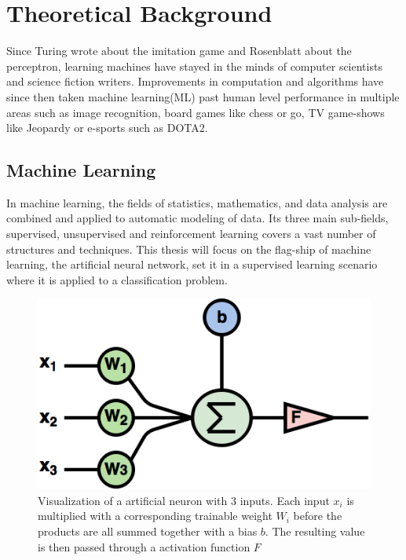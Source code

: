 \chapter{Theoretical Background}
Since Turing wrote about the imitation game\cite{imitationgame} and Rosenblatt about the perceptron\cite{perceptron}, learning machines have stayed in the minds of computer scientists and science fiction writers. 
Improvements in computation and algorithms have since then taken machine learning(ML) past human level performance in multiple areas such as image recognition\cite{youtubecats}\cite{deepface}, board games like chess\cite{alphazero} or go\cite{alphago}, TV game-shows like Jeopardy\cite{jeopardy} or e-sports such as DOTA2\cite{dota2}.

\section{Machine Learning}
\label{background:ML}
 
In machine learning, the fields of statistics, mathematics, and data analysis are combined and applied to automatic modeling of data. Its three main sub-fields, supervised, unsupervised and reinforcement learning covers a vast number of structures and techniques. This thesis will focus on the flag-ship of machine learning, the artificial neural network,  set it in a supervised learning scenario where it is applied to a classification problem.

\begin{figure}[ht] 
\centering
\includegraphics[width=0.7\linewidth]{Chapters/2.Background/figures/artificial_neuron.png}
\caption[Visualization of a artificial neuron]{Visualization of a artificial neuron with 3 inputs. Each input \(x_{i}\) is multiplied with a corresponding trainable weight \(W_{i}\) before the products are all summed together with a bias \(b\). The resulting value is then passed through a activation function \(F\)}
\label{fig:artificialneuron}
\end{figure}

